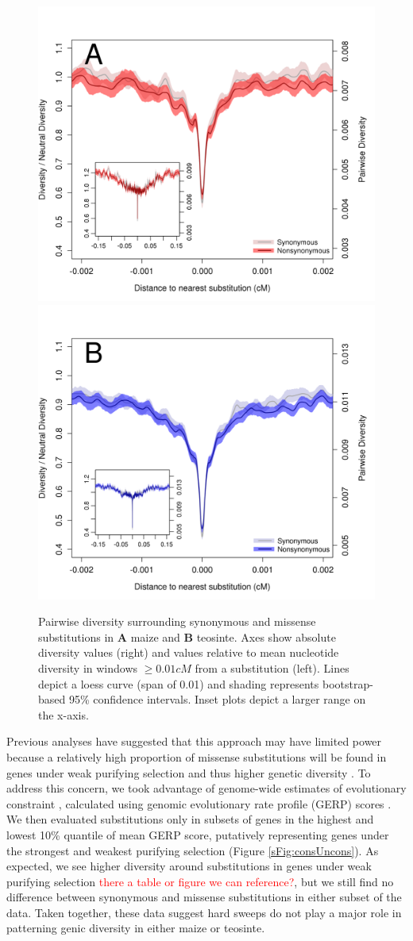 \documentclass{pnastwo}
\newcommand{\jri}[1]{\textcolor{red}{\scriptsize #1}}
\begin{document}
\begin{article}
\begin{figure}
\centering
\includegraphics[width=.45\textwidth]{FigsAndFiles/plotDiversity_TvM_Folded2_Significance_Aug}
\hspace{0.05\textwidth} \includegraphics[width=.45\textwidth]{FigsAndFiles/plotDiversity_TvT_Folded2_Significance_Aug}
\caption{Pairwise diversity surrounding synonymous and missense  substitutions in {\bf A} maize and {\bf B} teosinte. Axes show absolute diversity values (right) and values relative to mean nucleotide diversity in windows $\geq 0.01 cM$ from a substitution (left).  Lines depict a loess curve (span of 0.01) and shading represents bootstrap-based 95\% confidence intervals. Inset plots depict a larger range on the x-axis. \label{fig:hardSweeps}}
\end{figure}

Previous analyses have suggested that this approach may have limited power because a relatively high proportion of missense substitutions will be found in genes under weak purifying selection and thus higher genetic diversity \cite{enard2014}. 
To address this concern, we took advantage of genome-wide estimates of evolutionary constraint \cite{rodgers2015}, calculated using genomic evolutionary rate profile (GERP) scores \cite{davydov2010}. 
We then evaluated substitutions only in subsets of genes in the highest and lowest 10\% quantile of mean GERP score, putatively representing genes under the strongest and weakest purifying selection  (Figure \ref{sFig:consUncons}). 
As expected, we see higher diversity around substitutions in genes under weak purifying selection \jri{there a table or figure we can reference?}, but we still find no difference between synonymous and missense substitutions in either subset of the data.
Taken together, these data suggest hard sweeps do not play a major role in patterning genic diversity in either maize or teosinte.


\end{article}
\end{document}
